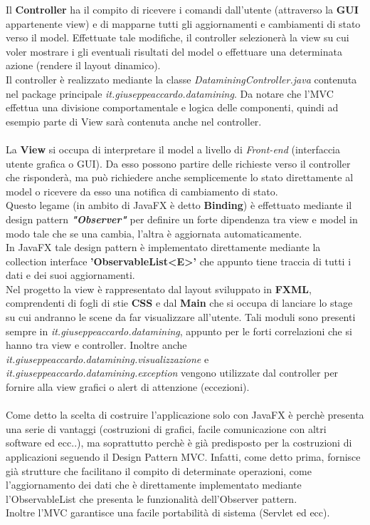 \documentclass[a4paper, oneside]{book}
\begin{document}
Il \textbf{Controller} ha il compito di ricevere i comandi dall'utente (attraverso la \textbf{GUI} appartenente view) e di mapparne tutti gli aggiornamenti e cambiamenti di stato verso il model. Effettuate tale modifiche, il controller selezionerà la view su cui voler mostrare i gli eventuali risultati del model o effettuare una determinata azione (rendere il layout dinamico).\\
Il controller è realizzato mediante la classe \textit{DataminingController.java} contenuta nel package principale \textit{it.giuseppeaccardo.datamining}. Da notare che l'MVC effettua una divisione comportamentale e logica delle componenti, quindi ad esempio parte di View sarà contenuta anche nel controller.
\\
\\
La \textbf{View} si occupa di interpretare il model a livello di \textit{Front-end} (interfaccia utente grafica o GUI). Da esso possono partire delle richieste verso il controller che risponderà, ma può richiedere anche semplicemente lo stato direttamente al model o ricevere da esso una notifica di cambiamento di stato. \\Questo legame (in ambito di JavaFX è detto \textbf{Binding}) è effettuato mediante il design pattern \textit{\textbf{"Observer"}}  per definire un forte dipendenza tra view e model in modo tale che se una cambia, l'altra è aggiornata automaticamente. \\In JavaFX tale design pattern è implementato direttamente mediante la collection interface \textbf{'ObservableList<E>'} che appunto tiene traccia di tutti i dati e dei suoi aggiornamenti.\\
Nel progetto la view è rappresentato dal layout sviluppato in \textbf{FXML}, comprendenti di fogli di stie \textbf{CSS} e dal \textbf{Main} che si occupa di lanciare lo stage su cui andranno le scene da far visualizzare all'utente. Tali moduli sono presenti sempre in \textit{it.giuseppeaccardo.datamining}, appunto per le forti correlazioni che si hanno tra view e controller. Inoltre anche \textit{it.giuseppeaccardo.datamining.visualizzazione} e \textit{it.giuseppeaccardo.datamining.exception} vengono utilizzate dal controller per fornire alla view grafici o alert di attenzione (eccezioni).\\
\\
Come detto la scelta di costruire l'applicazione solo con JavaFX è perchè presenta una serie di vantaggi (costruzioni di grafici, facile comunicazione con altri software ed ecc..), ma soprattutto perchè è già predisposto per la costruzioni di applicazioni seguendo il Design Pattern MVC. Infatti, come detto prima, fornisce già strutture che facilitano il compito di determinate operazioni, come l'aggiornamento dei dati che è direttamente implementato mediante l'ObservableList che presenta le funzionalità dell'Observer pattern. \\
Inoltre l'MVC garantisce una facile portabilità di sistema (Servlet ed ecc).
\end{document}
